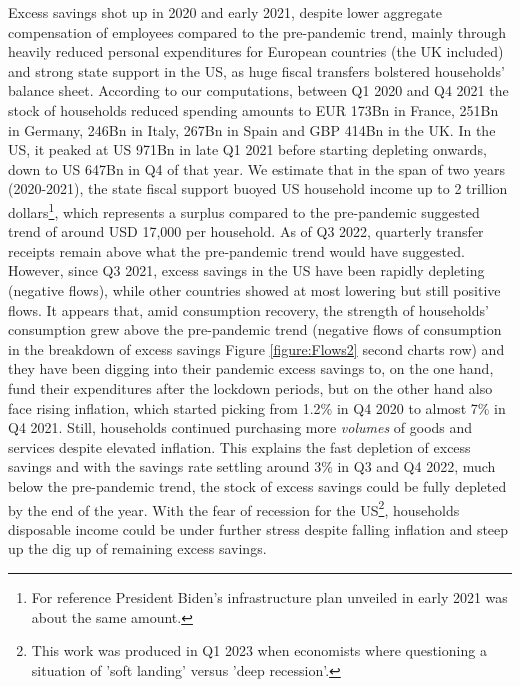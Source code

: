 Excess savings shot up in 2020 and early 2021, despite lower aggregate compensation of employees compared to the pre-pandemic trend, mainly through heavily reduced personal expenditures for European countries (the UK included) and strong state support in the US, as huge fiscal transfers bolstered households’ balance sheet. 
According to our computations, between Q1 2020 and Q4 2021 the stock of households reduced spending amounts to EUR 173Bn in France, 251Bn in Germany, 246Bn in Italy, 267Bn in Spain and GBP 414Bn in the UK. 
In the US, it peaked at US 971Bn in late Q1 2021 before starting depleting onwards, down to US 647Bn in Q4 of that year.
We estimate that in the span of two years (2020-2021), the state fiscal support buoyed US household income up to 2 trillion dollars\footnote{For reference President Biden's infrastructure plan unveiled in early 2021 was about the same amount.}, which represents a surplus compared to the pre-pandemic suggested trend of around USD 17,000 per household. 
As of Q3 2022, quarterly transfer receipts remain above what the pre-pandemic trend would have suggested. 
However, since Q3 2021, excess savings in the US have been rapidly depleting (negative flows), while other countries showed at most lowering but still positive flows.
It appears that, amid consumption recovery, the strength of households’ consumption grew above the pre-pandemic trend (negative flows of consumption in the breakdown of excess savings Figure \ref{figure:Flows2} second charts row) and they have been digging into their pandemic excess savings to, on the one hand, fund their expenditures after the lockdown periods, but on the other hand also face rising inflation, which started picking from 1.2\% in Q4 2020 to almost 7\% in Q4 2021. 
Still, households continued purchasing more \textit{volumes} of goods and services despite elevated inflation. 
This explains the fast depletion of excess savings and with the savings rate settling around 3\% in Q3 and Q4 2022, much below the pre-pandemic trend, the stock of excess savings could be fully depleted by the end of the year. 
With the fear of recession for the US\footnote{This work was produced in Q1 2023 when economists where questioning a situation of 'soft landing' versus 'deep recession'.}, households disposable income could be under further stress despite falling inflation and steep up the dig up of remaining excess savings.

